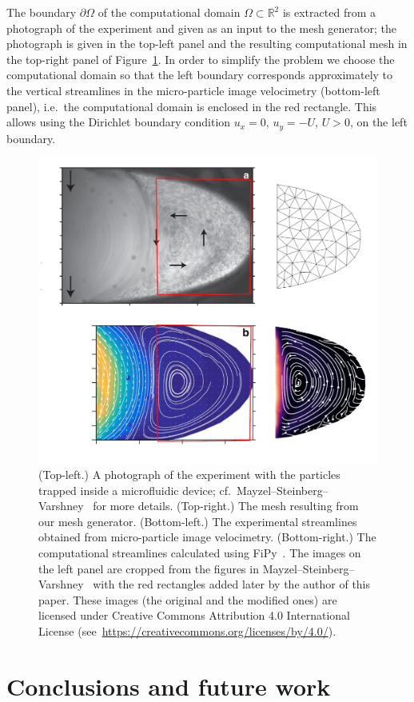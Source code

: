 \documentclass[11pt]{article}
\begin{document}
The boundary $\partial \Omega$ of the computational domain $\Omega \subset
\mathbb{R}^2$ is extracted from a photograph of the experiment and given as an
input to the mesh generator; the photograph is given in the top-left panel and
the resulting computational mesh in the top-right panel of
Figure~\ref{fig:esimerkki}.  In order to simplify the problem we choose the
computational domain so that the left boundary corresponds approximately to the
vertical streamlines in the micro-particle image velocimetry (bottom-left
panel), i.e.~the computational domain is enclosed in the red rectangle.  This
allows using the Dirichlet boundary condition $u_x = 0$, $u_y = -U$, $U > 0$, on
the left boundary.

\begin{figure}[htbp]
\centering
\includegraphics[width=\textwidth]{./esimerkki_vertailu.png}
\caption{(Top-left.) A photograph of the experiment with the particles trapped
  inside a microfluidic device;
  cf.~Mayzel--Steinberg--Varshney~\cite{mayzel2019stokes} for more details.
  (Top-right.) The mesh resulting from our mesh generator. (Bottom-left.)  The
  experimental streamlines obtained from micro-particle image velocimetry.
  (Bottom-right.) The computational streamlines calculated using
  FiPy~\cite{FiPy2009}.  The images on the left panel are cropped from the
  figures in Mayzel--Steinberg--Varshney~\cite{mayzel2019stokes} with the red
  rectangles added later by the author of this paper.  These images (the
  original and the modified ones) are licensed under Creative Commons
  Attribution 4.0 International License
  (see~\url{https://creativecommons.org/licenses/by/4.0/}).}
\label{fig:esimerkki}
\end{figure}

\section{Conclusions and future work}
\label{sec:org615e973}



\end{document}
